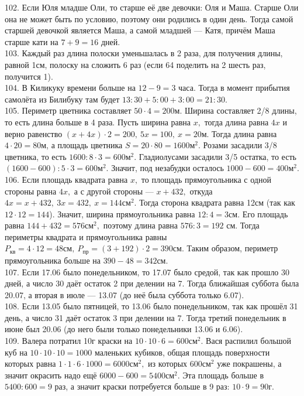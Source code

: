 \documentclass[12pt]{article}
\begin{document}
102. Если Юля младше Оли, то старше её две девочки: Оля и Маша. Старше Оли она не может быть по условию, поэтому они родились в один день. Тогда самой старшей девочкой является Маша, а самой младшей --- Катя, причём Маша старше кати на $7+9=16$ дней.\\
103. Каждый раз длина полоски уменьшалась в 2 раза, для получения длины, равной 1см, полоску на сложить 6 раз (если 64 поделить на 2 шесть раз, получится 1).\\
104. В Киликуку времени больше на $12-9=3$ часа. Тогда в момент прибытия самолёта из Билибуку там будет $13:30+5:00+3:00=21:30.$\\
105. Периметр цветника составляет $50\cdot4=200$м. Ширина составляет 2/8 длины, то есть длина больше в 4 раза. Пусть ширина равна $x,$ тогда длина равна $4x$ и верно равенство $(x+4x)\cdot2=200,\ 5x=100,\ x=20$м. Тогда длина равна $4\cdot20=80$м, а площадь цветника $S=20\cdot80=1600\text{м}^2.$ Розами засадили 3/8 цветника, то есть $1600:8\cdot3=600\text{м}^2.$ Гладиолусами засадили 3/5 остатка, то есть $(1600-600):5\cdot3=600\text{м}^2.$ Значит, под незабудки осталось $1000-600=400\text{м}^2.$\\
106. Если площадь квадрата равна $x,$ то площадь прямоугольника с одной стороны равна $4x,$ а с другой стороны --- $x+432,$ откуда $4x=x+432,\ 3x=432,\ x=144\text{см}^2.$ Тогда сторона квадрата равна 12см (так как $12\cdot12=144$). Значит, ширина прямоугольника равна $12:4=3$см. Его площадь равна $144+432=576\text{см}^2,$ поэтому длина равна $576:3=192$ см. Тогда периметры квадрата и прямоугольника равны $P_\text{кв}=4\cdot12=48\text{см},\ P_\text{пр}=(3+192)\cdot2=390\text{см}.$ Таким образом, периметр прямоугольника больше на $390-48=342$см.\\
107. Если 17.06 было понедельником, то 17.07 было средой, так как прошло 30 дней, а число 30 даёт остаток 2 при делении на 7. Тогда ближайшая суббота была 20.07, а вторая в июле --- 13.07 (до неё была суббота только 6.07).\\
108. Если 13.05 было пятницей, то 13.06 было понедельником, так как прошёл 31 день, а число 31 даёт остаток 3 при делении на 7. Тогда третий понедельник в июне был 20.06 (до него были только понедельники 13.06 и 6.06).\\
109. Валера потратил 10г краски на $10\cdot10\cdot6=600\text{см}^2.$ Вася распилил большой куб на $10\cdot10\cdot10=1000$ маленьких кубиков, общая площадь поверхности которых равна $1\cdot1\cdot6\cdot1000=6000\text{см}^2,$ из которых $600\text{см}^2$ уже покрашены, а значит окрасить надо ещё $6000-600=5400\text{см}^2.$ Эта площадь больше в $5400:600=9$ раз, а значит краски потребуется больше в 9 раз: $10\cdot9=90$г.\\
\end{document}
